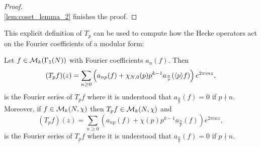 \begin{proof}
\[        \]
        \cref{lem:coset_lemma_2} finishes the proof.
      \end{proof}

      This explicit definition of $T_{p}$ can be used to compute how the Hecke operators act on the Fourier coefficients of a modular form:

      \begin{proposition}\label{prop:prime_Hecke_operators_acting_on_Fourier_coefficients_modular}
        Let $f \in \mathcal{M}_{k}(\Gamma_{1}(N))$ with Fourier coefficients $a_{n}(f)$. Then
        \[
          (T_{p}f)(z) = \sum_{n \ge 0}\left(a_{np}(f)+\chi_{N,0}(p)p^{k-1}a_{\frac{n}{p}}(\langle p\rangle f)\right)e^{2\pi inz},
        \]
        is the Fourier series of $T_{p}f$ where it is understood that $a_{\frac{n}{p}}(f) = 0$ if $p \nmid n$. Moreover, if $f \in \mathcal{M}_{k}(N,\chi)$ then $T_{p}f \in \mathcal{M}_{k}(N,\chi)$ and
        \[
          (T_{p}f)(z) = \sum_{n \ge 0}\left(a_{np}(f)+\chi(p)p^{k-1}a_{\frac{n}{p}}(f)\right)e^{2\pi inz},
        \]
        is the Fourier series of $T_{p}f$ where it is understood that $a_{\frac{n}{p}}(f) = 0$ if $p \nmid n$.
      \end{proposition}
